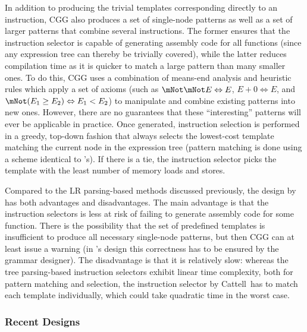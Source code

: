 In addition to producing the trivial \glspl{template} corresponding directly to
an \gls{instruction}, \gls{CGG} also produces a set of single-\gls{node}
\glspl{pattern} as well as a set of larger \glspl{pattern} that combine several
\glspl{instruction}.
%
The former ensures that the \gls{instruction selector} is capable of generating
\gls{assembly code} for all \glspl{function} (since any \gls{expression tree}
can thereby be trivially covered), while the latter reduces compilation time as
it is quicker to match a large \gls{pattern} than many smaller ones.
%
To do this, \gls{CGG} uses a combination of \gls{means-end analysis} and
heuristic \glspl{rule} which apply a set of axioms (such as \mbox{$\mNot \mNot E
  \Leftrightarrow E$}, \mbox{$E + 0 \Leftrightarrow E$}, and \mbox{$\mNot (E_1
  \geq E_2) \Leftrightarrow E_1 < E_2$}) to manipulate and combine existing
\glspl{pattern} into new ones.
%
However, there are no guarantees that these ``interesting'' \glspl{pattern} will
ever be applicable in practice.
%
Once generated, \gls{instruction selection} is performed in a greedy, top-down
fashion that always selects the lowest-cost \gls{template} matching the current
\gls{node} in the \gls{expression tree} (\gls{pattern matching} is done using a
scheme identical to \citeauthor{Newcomer:1975}'s).
%
If there is a tie, the \gls{instruction selector} picks the \gls{template} with
the least number of memory loads and stores.

Compared to the \gls{LR parsing}-based methods discussed previously, the design
by \citeauthor{CattellEtAl:1979} has both advantages and disadvantages.
%
The main advantage is that the \glspl{instruction selector} is less at risk of
failing to generate \gls{assembly code} for some \gls{function}.
%
There is the possibility that the set of predefined \glspl{template} is
insufficient to produce all necessary single-node \glspl{pattern}, but then
\gls{CGG} can at least issue a warning (in
\citeauthor{GanapathiEtAl:1982:AttrGr}'s design this correctness has to be
ensured by the \gls{grammar} designer).
%
The disadvantage is that it is relatively slow: whereas the \gls{tree
  parsing}-based \glspl{instruction selector} exhibit linear time complexity,
both for \gls{pattern matching} and selection, the \gls{instruction selector} by
Cattell~\etal has to match each \gls{template} individually, which could take
quadratic time in the worst case.


\subsubsection{Recent Designs}

